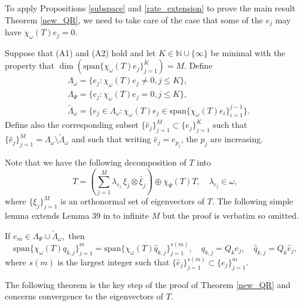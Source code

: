 \documentclass[a4paper,10pt]{article}
\begin{document}
To apply Propositions \ref{subspace} and \ref{rate_extension} to prove the main result Theorem \ref{new_QR}, we need to take care of the case that some of the $e_j$ may have $\chi_{\omega}(T)e_j=0$. 



\begin{definition}
\label{define_the_basis}
Suppose that (A1) and (A2) hold and let $K\in\mathbb{N}\cup\{\infty\}$ be minimal with the property that $\dim(\mathrm{span}\{\chi_{\omega}(T)e_j\}_{j=1}^K) = M.$ Define 
\begin{align*}
&\Lambda_{\omega} = \{e_j:\chi_{\omega}(T)e_j \neq 0, j\leq K\}, \\
&\Lambda_{\Psi}= \{e_j:\chi_{\omega}(T)e_j = 0, j \leq K\},\\
&\tilde \Lambda_{\omega} = \{e_j \in
\Lambda_{\omega}:\chi_{\omega}(T)e_j \in
\mathrm{span}\{\chi_{\omega}(T)e_i\}_{i=1}^{j-1}\}.
\end{align*}
Define also the corresponding subset $\{\hat e_j\}_{j=1}^M\subset\{e_j\}_{j=1}^K$ such that $\{\hat e_j\}_{j=1}^M = \Lambda_{\omega}\setminus \tilde \Lambda_{\omega}$ and such that writing $\hat{e}_j=e_{p_j}$, the $p_j$ are increasing.
\end{definition}

Note that we have the following decomposition of $T$ into 
\[
T = \left(\sum_{j=1}^M \lambda_{c_j} \,\xi_j\otimes \bar \xi_j \right)\oplus
\chi_{\Psi}(T)T, \quad \lambda_{c_j} \in \omega, 
\]
where $\{\xi_j\}_{j=1}^M$ is an orthonormal set of eigenvectors of $T$. The following simple lemma extends Lemma 39 in \cite{hansen2008} to infinite $M$ but the proof is verbatim so omitted.

\begin{lemma}\label{lemma_span}
If $e_m \in
  \Lambda_{\Psi} \cup
  \tilde \Lambda_{\omega},$ then
\[
\mathrm{span}\{\chi_{\omega}(T) q_{k,j}\}_{j=1}^m =
  \mathrm{span}\{\chi_{\omega}(T) \hat q_{k,j}\}_{j=1}^{s(m)}, \quad 
 q_{k,j} = Q_k  e_j, \quad \hat q_{k,j} = Q_k \hat e_j,
\] 
where $s(m)$ 
is the largest integer such that $\{\hat e_j\}_{j=1}^{s(m)}
  \subset \{e_j\}_{j=1}^m.$ 
\end{lemma}

The following theorem is the key step of the proof of Theorem \ref{new_QR} and concerns convergence to the eigenvectors of $T$.
\end{document}
